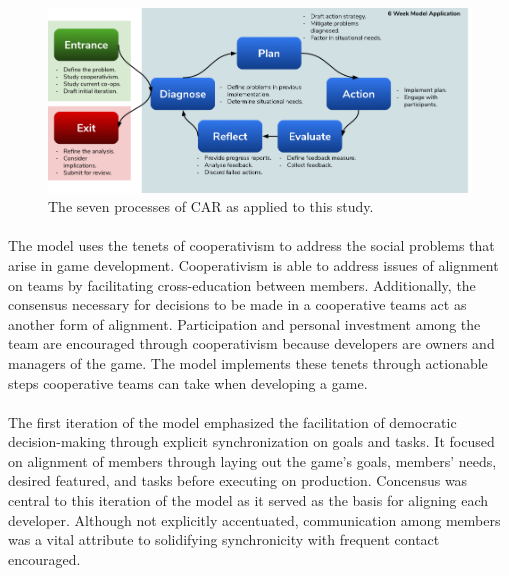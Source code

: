 \paragraph{}

\begin{figure}[h!]
    \centering
    \includegraphics[width=\linewidth]{Figures/AppliedCAR.png}
    \caption{The seven processes of CAR as applied to this study.}
\end{figure}

\paragraph{} The model uses the tenets of cooperativism to address the social problems that arise in game development. Cooperativism is able to address issues of alignment on teams by facilitating cross-education between members. Additionally, the consensus necessary for decisions to be made in a cooperative teams act as another form of alignment. Participation and personal investment among the team are encouraged through cooperativism because developers are owners and managers of the game. The model implements these tenets through actionable steps cooperative teams can take when developing a game. 

\paragraph{} The first iteration of the model emphasized the facilitation of democratic decision-making through explicit synchronization on goals and tasks. It focused on alignment of members through laying out the game's goals, members' needs, desired featured, and tasks before executing on production. Concensus was central to this iteration of the model as it served as the basis for aligning each developer. Although not explicitly accentuated, communication among members was a vital attribute to solidifying synchronicity with frequent contact encouraged.

